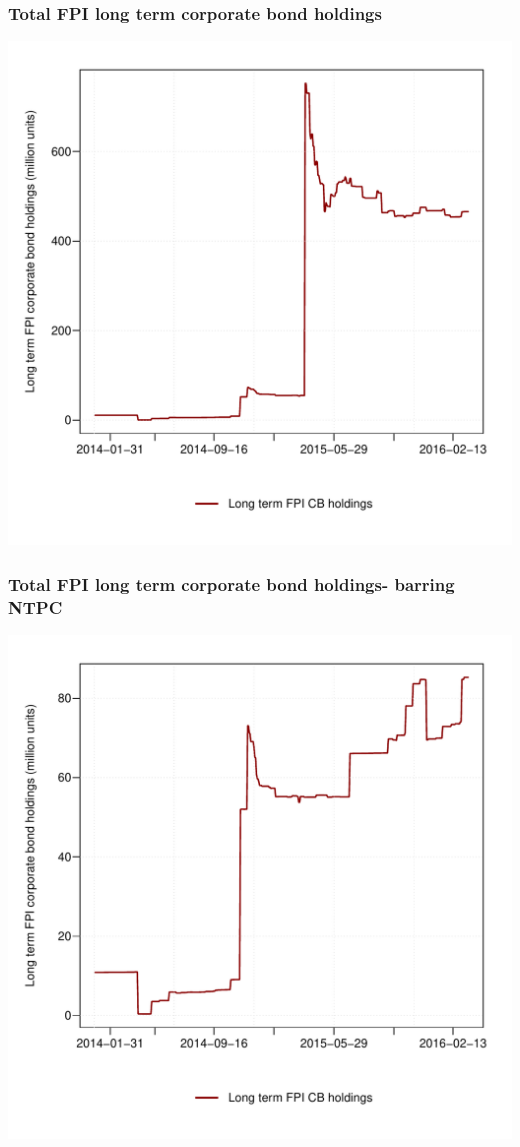 \documentclass[9pt]{beamer}
\begin{document}
\begin{frame}
 \frametitle{Total FPI long term corporate bond holdings}
   \centering
   \includegraphics[width=0.8\paperwidth,height=0.5\paperwidth]{../GRAPHS/fpi_sum_long_term_cbs_all.pdf}
\end{frame}

\begin{frame}
 \frametitle{Total FPI long term corporate bond holdings- barring NTPC}
   \centering
   \includegraphics[width=0.8\paperwidth,height=0.5\paperwidth]{../GRAPHS/fpi_sum_long_term_minus_ntpc_cbs_all.pdf}
\end{frame}
\end{document}
